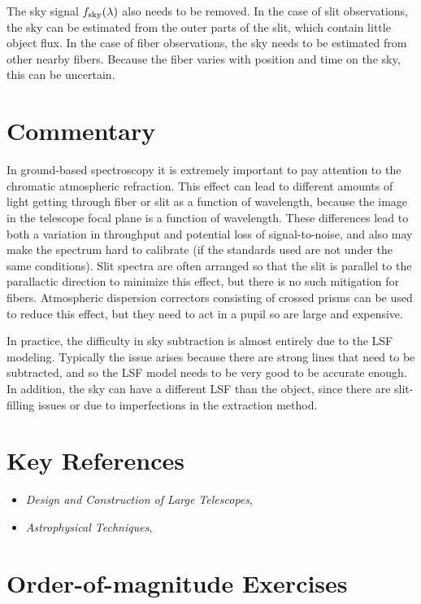 The sky signal $f_{\rm sky}(\lambda)$ also needs to be removed. In the
case of slit observations, the sky can be estimated from the outer
parts of the slit, which contain little object flux. In the case of
fiber observations, the sky needs to be estimated from other nearby
fibers. Because the fiber varies with position and time on the sky,
this can be uncertain.

\section{Commentary}

In ground-based spectroscopy it is extremely important to pay
attention to the chromatic atmospheric refraction. This effect can
lead to different amounts of light getting through fiber or slit as a
function of wavelength, because the image in the telescope focal plane
is a function of wavelength. These differences lead to both a
variation in throughput and potential loss of signal-to-noise, and
also may make the spectrum hard to calibrate (if the standards used
are not under the same conditions). Slit spectra are often arranged so
that the slit is parallel to the parallactic direction to minimize
this effect, but there is no such mitigation for fibers. Atmospheric
dispersion correctors consisting of crossed prisms can be used to
reduce this effect, but they need to act in a pupil so are large and
expensive.

In practice, the difficulty in sky subtraction is almost entirely due
to the LSF modeling. Typically the issue arises because there are
strong lines that need to be subtracted, and so the LSF model needs to
be very good to be accurate enough. In addition, the sky can have a
different LSF than the object, since there are slit-filling
issues or due to imperfections in the extraction method.

\section{Key References}

\begin{itemize}
  \item
    {\it Design and Construction of Large Telescopes},
      \citet{bely03a}
  \item
    {\it Astrophysical Techniques}, \citet{kitchin09a}
\end{itemize}


\section{Order-of-magnitude Exercises}

